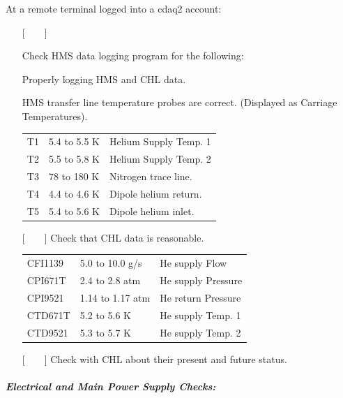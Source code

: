 At a remote terminal logged into a cdaq2 account:

\begin{itemize}
\item[{[~~~~]}]{Check HMS data logging program for the following:

Properly logging HMS and CHL data.

HMS transfer line temperature probes are correct.  (Displayed as
Carriage Temperatures).}
\begin{center}
  \begin{tabular}{lll}
T1	& 5.4 to 5.5 K	& Helium Supply Temp. 1	\\
T2	& 5.5 to 5.8 K	& Helium Supply Temp. 2	\\
T3	& 78 to 180 K	& Nitrogen  trace line.	\\
T4	& 4.4 to 4.6 K	& Dipole helium return.	\\
T5	& 5.4 to 5.6 K	& Dipole helium inlet.	\\
  \end{tabular}
\end{center}
\item[{[~~~~]}]{Check that CHL data is reasonable.}
\begin{center}
  \begin{tabular}{lll}
CFI1139 & 5.0 to 10.0 g/s & He supply Flow \\
CPI671T & 2.4 to 2.8 atm & He supply Pressure \\
CPI9521 & 1.14 to 1.17 atm & He return Pressure \\
CTD671T & 5.2 to 5.6 K & He supply Temp. 1 \\
CTD9521 & 5.3 to 5.7 K & He supply Temp. 2 \\
\end{tabular}
\end{center}
\item[{[~~~~]}]{Check with CHL about their present and future status.}
\end{itemize}


\subparagraph{Electrical and Main Power Supply Checks:}

